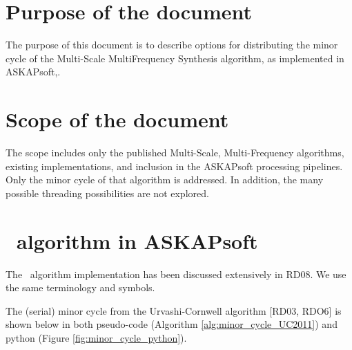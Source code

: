 \documentclass[11pt,a4paper,variablewidth]{article}
\begin{document}
\pagebreak
\section{Purpose of the document}


The purpose of this document is to describe options for distributing the minor cycle of the Multi-Scale MultiFrequency Synthesis algorithm, as implemented in ASKAPsoft,.

\section{Scope of the document}

The scope includes only the published Multi-Scale, Multi-Frequency algorithms, existing implementations, and inclusion in the ASKAPsoft processing pipelines. Only the minor cycle of that algorithm is addressed. In addition, the many possible threading possibilities are not explored.

\clearpage

\section{\MAM\ algorithm in ASKAPsoft}

The \MAM\ algorithm implementation has been discussed extensively in RD08. We use the same terminology and symbols.

The (serial) minor cycle from the Urvashi-Cornwell algorithm [RD03, RDO6] is shown below in both pseudo-code (Algorithm \ref{alg:minor_cycle_UC2011}) and python (Figure \ref{fig:minor_cycle_python}).
\end{document}
